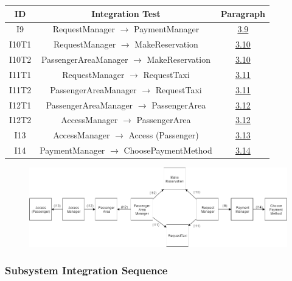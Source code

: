 \documentclass[18pt,oneside,a4paper, titlepage]{article}
\begin{document}
\begin{itemize}
					\vspace{1cm}
					\begin{center}
						\centering
						\begin{tabular}{c c c}
							\hline \textbf{ID} & \textbf{Integration Test} & \textbf{Paragraph} \\
							\hline		I9 & RequestManager $\rightarrow$ PaymentManager & \hyperlink{chapter 3.9}{3.9}\\
							\hline		I10T1 & RequestManager $\rightarrow$ MakeReservation & \hyperlink{chapter 3.10}{3.10} \\
							\hline		I10T2 & PassengerAreaManager $\rightarrow$ MakeReservation & \hyperlink{chapter 3.10}{3.10}\\
							\hline		I11T1 & RequestManager $\rightarrow$ RequestTaxi & \hyperlink{chapter 3.11}{3.11}\\
							\hline		I11T2 & PassengerAreaManager $\rightarrow$ RequestTaxi & \hyperlink{chapter 3.11}{3.11} \\
							\hline		I12T1 & PassengerAreaManager $\rightarrow$ PassengerArea & \hyperlink{chapter 3.12}{3.12} \\
							\hline		I12T2 & AccessManager $\rightarrow$ PassengerArea & \hyperlink{chapter 3.12}{3.12}\\
							\hline		I13 & AccessManager $\rightarrow$ Access (Passenger) & \hyperlink{chapter 3.13}{3.13} \\
							\hline		I14 & PaymentManager $\rightarrow$ ChoosePaymentMethod & \hyperlink{chapter 3.14}{3.14} \\
							\hline
						\end{tabular}
					\end{center}
					
					
					\begin{figure}[h]
						\centering
						\includegraphics[scale=0.4]{PassengerSubsystem.png}
					\end{figure}
			\end{itemize}
			\vspace{1cm}
			
		\subsubsection{Subsystem Integration Sequence}
			
\end{document}
